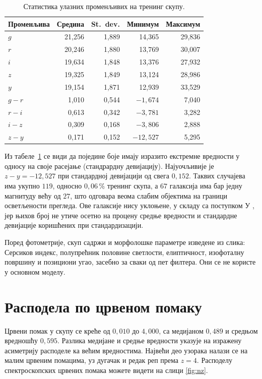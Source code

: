 \documentclass[12pt,oneside]{memoir}
\begin{document}
\begin{table}[htbp]
\centering
\caption{Статистика улазних променљивих на тренинг скупу.}
\label{tab:atributi}
\begin{tabular}{lrrrr}
\toprule
Променљива & Средина & St.\ dev. & Минимум & Максимум \\
\midrule
$g$   & 21,256 & 1,889 & 14,365 & 29,836 \\
$r$   & 20,246 & 1,880 & 13,769 & 30,007 \\
$i$   & 19,634 & 1,848 & 13,376 & 27,932 \\
$z$   & 19,325 & 1,849 & 13,124 & 28,986 \\
$y$   & 19,154 & 1,871 & 12,939 & 33,529 \\
\midrule
$g-r$ &  1,010 & 0,544 & $-1,674$ &  7,040 \\
$r-i$ &  0,613 & 0,342 & $-3,781$ &  3,282 \\
$i-z$ &  0,309 & 0,168 & $-3,806$ &  2,888 \\
$z-y$ &  0,171 & 0,152 & $-12,527$ &  5,295 \\
\bottomrule
\end{tabular}
\end{table}

Из табеле~\ref{tab:atributi} се види да поједине боје имају изразито екстремне вредности у 
односу на своје расејање (стандрардну девијацију). Најуочљивије је $z-y = -12{,}527$
при стандардној девијацији од свега $0{,}152$. Таквих случајева има укупно $119$, односно 
$0{,}06\,\%$ тренинг скупа, а $67$ галаксија има бар једну магнитуду већу од $27$, што одговара 
веома слабим објектима на граници осветљености прегледа. Ове галаксије нису уклоњене, у складу са поступком У
\cite{jones2024a, jones2024b}, јер њихов број не утиче осетно на процену средње вредности и 
стандардне девијације коришћених при стандардизацији.

Поред фотометрије, скуп садржи и морфолошке параметре изведене из слика: Серсиков индекс, полупрећник половине
светлости, елиптичност, изофоталну површину и позициони угао, засебно за сваки од пет филтера.
Они се не користе у основном моделу.

\section{Расподела по црвеном помаку}
\label{sec:raspodela}

Црвени помак у скупу се креће од $0{,}010$ до $4{,}000$, са медијаном $0{,}489$ и 
средњом вредношћу $0{,}595$. Разлика медијане и средње вредности указује на изражену 
асиметрију расподеле ка већим вредностима. Највећи део узорака налази се на малим црвеним помацима, уз дугачак и 
редак реп према $z = 4$. Расподелу спектроскопских црвених помака можете видети на слици \ref{fig:nz}.
\end{document}
